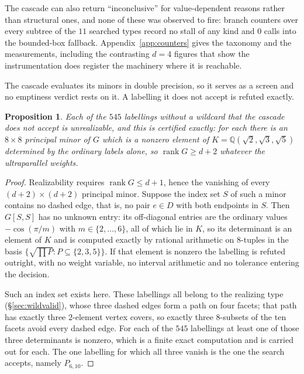 \documentclass[11pt,reqno]{amsart}
\theoremstyle{plain}
\newtheorem{proposition}[theorem]{Proposition}
\theoremstyle{definition}
\DeclareMathOperator{\rank}{rank}
\newcommand{\QQ}{\mathbb{Q}}
\newcommand{\Gr}{G}
\newcommand{\PP}{P_{6,10}}
\newcommand{\NumRequired}{11}
\newcommand{\PlainRejected}{545}
\begin{document}
The cascade can also return ``inconclusive'' for value-dependent reasons rather
than structural ones, and none of these was observed to fire: branch counters over
every subtree of the $\NumRequired$ searched types
record no stall of any kind and $0$ calls into the
bounded-box fallback. Appendix~\ref{app:counters} gives the taxonomy and the
measurements, including the contrasting $d=4$ figures that show the instrumentation
does register the machinery where it is reachable.

The cascade evaluates its minors in double precision, so it serves as a screen and
no emptiness verdict rests on it. A labelling it does not accept is refuted
exactly.

\begin{proposition}
\label{prop:plainexact}
Each of the $\PlainRejected$ labellings without a wildcard that the cascade does
not accept is unrealizable, and this is certified exactly: for each there is an
$8\times8$ principal minor of $\Gr$ which is a nonzero element of
$K=\QQ(\sqrt2,\sqrt3,\sqrt5)$ determined by the ordinary labels alone, so
$\rank\Gr\ge d+2$ whatever the ultraparallel weights.
\end{proposition}

\begin{proof}
Realizability requires $\rank\Gr\le d+1$, hence the vanishing of every
$(d+2)\times(d+2)$ principal minor. Suppose the index set $S$ of such a minor
contains no dashed edge, that is, no pair $e\in D$ with both endpoints in $S$.
Then $\Gr[S,S]$ has no unknown entry: its off-diagonal entries are the ordinary
values $-\cos(\pi/m)$ with $m\in\{2,\dots,6\}$, all of which lie in $K$, so its
determinant is an element of $K$ and is computed exactly by rational arithmetic on
$8$-tuples in the basis $\{\sqrt{\prod P}:P\subseteq\{2,3,5\}\}$. If that element
is nonzero the labelling is refuted outright, with no weight variable, no interval
arithmetic and no tolerance entering the decision.

Such an index set exists here. These labellings all belong to the realizing type
(\S\ref{sec:wildvalid}), whose three dashed edges form a path on four facets; that
path has exactly three $2$-element vertex covers, so exactly three $8$-subsets of
the ten facets avoid every dashed edge. For each of the $\PlainRejected$
labellings at least one of those three determinants is nonzero, which is a finite
exact computation and is carried out for each. The one labelling for which all
three vanish is the one the search accepts, namely $\PP$.
\end{proof}
\end{document}

